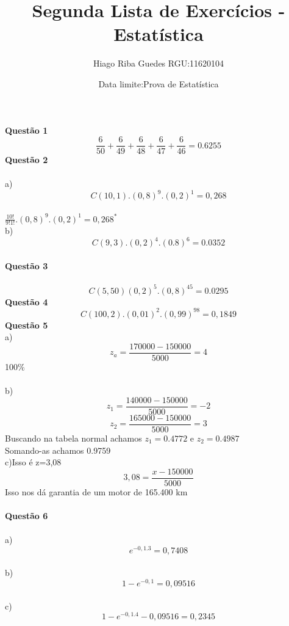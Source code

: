 \documentclass{article}
\title{Segunda Lista de Exerc\'icios -Estat\'istica}
\author{Hiago Riba Guedes RGU:11620104}
\date{Data limite:Prova de Estat\'istica }
\begin{document}
\maketitle

\textbf{Quest\~ao 1}\\
$$\frac{6}{50}+\frac{6}{49}+\frac{6}{48}+\frac{6}{47}+\frac{6}{46} =0.6255 $$
\textbf{Quest\~ao 2}\\\\
a)$$C(10,1).(0,8)^9.(0,2)^1=0,268$$\\
$\frac{10!}{9!1!}.(0,8)^9.(0,2)^1=0,268^*$\\
b)$$C(9,3).(0,2)^4.(0.8)^6=0.0352$$\\
\textbf{Quest\~ao 3}\\\\
$$C(5,50)(0,2)^5.(0,8)^{45}=0.0295$$
\textbf{Quest\~ao 4}\\
$$C(100,2).(0,01)^{2}.(0,99)^{98}=0,1849$$
\textbf{Quest\~ao 5}\\
a) $$z_a=\frac{170000-150000}{5000}=4$$
100$\%$
\\\\
b)$$z_1=\frac{140000-150000}{5000}=-2$$
$$z_2=\frac{165000-150000}{5000}=3$$
Buscando na tabela normal achamos $z_1=0.4772$ e $z_2=0.4987$\\
Somando-as achamos 0.9759\\
c)Isso \'e z=3,08\\
$$3,08=\frac{x-150000}{5000}$$
Isso nos d\'a garantia de um motor de 165.400 km\\\\
\textbf{Quest\~ao 6}\\\\
a)$$e^{-0,1.3}=0,7408$$
\\
b)$$1-e^{-0,1}=0,09516$$
\\
c)$$1-e^{-0,1.4}-0,09516=0,2345$$
\end{document}
